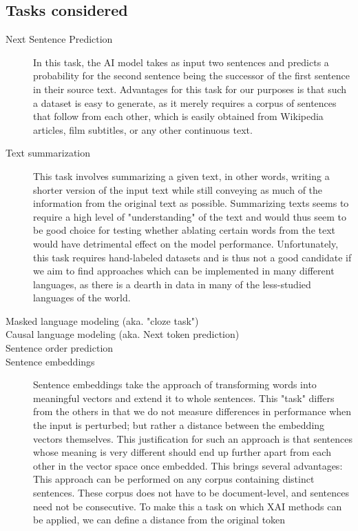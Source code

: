 \subsection{Tasks considered}
\begin{description}
	\item[Next Sentence Prediction]
	      In this task, the AI model takes as input two sentences and predicts a probability for the second sentence being the successor of the first sentence in their source text.
	      Advantages for this task for our purposes is that such a dataset is easy to generate, as it merely requires a corpus of sentences that follow from each other, which is easily obtained from Wikipedia articles, film subtitles, or any other continuous text.

	\item[Text summarization]
	      This task involves summarizing a given text, in other words, writing a shorter version of the input text while still conveying as much of the information from the original text as possible.
	      Summarizing texts seems to require a high level of "understanding" of the text and would thus seem to be good choice for testing whether ablating certain words from the text would have detrimental effect on the model performance.
	      Unfortunately, this task requires hand-labeled datasets and is thus not a good candidate if we aim to find approaches which can be implemented in many different languages, as there is a dearth in data in many of the less-studied languages of the world.

	\item[Masked language modeling (aka. "cloze task")]
	\item[Causal language modeling (aka. Next token prediction)]
	\item[Sentence order prediction]
	\item[Sentence embeddings]
	      Sentence embeddings take the approach of transforming words into meaningful vectors and extend it to whole sentences.
	      This "task" differs from the others in that we do not measure differences in performance when the input is perturbed; but rather a distance between the embedding vectors themselves.
	      This justification for such an approach is that sentences whose meaning is very different should end up further apart from each other in the vector space once embedded.
	      This brings several advantages:
	      This approach can be performed on any corpus containing distinct sentences.
	      These corpus does not have to be document-level, and sentences need not be consecutive.
			To make this a task on which XAI methods can be applied, we can define a distance from the original token
\end{description}

